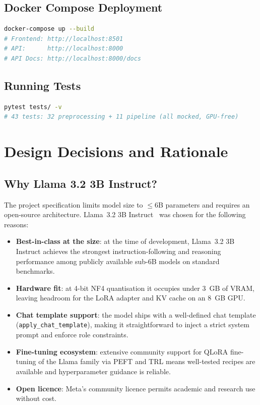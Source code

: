 \documentclass[12pt,a4paper]{article}
\begin{document}
\subsection{Docker Compose Deployment}

\begin{lstlisting}[language=bash, caption={Single-command containerised deployment}]
docker-compose up --build
# Frontend: http://localhost:8501
# API:      http://localhost:8000
# API Docs: http://localhost:8000/docs
\end{lstlisting}

\subsection{Running Tests}

\begin{lstlisting}[language=bash, caption={Unit test execution (no GPU required)}]
pytest tests/ -v
# 43 tests: 32 preprocessing + 11 pipeline (all mocked, GPU-free)
\end{lstlisting}

\section{Design Decisions and Rationale}

\subsection{Why Llama 3.2 3B Instruct?}

The project specification limits model size to $\leq$6B parameters and requires
an open-source architecture.  Llama~3.2 3B Instruct~\cite{llama32} was chosen
for the following reasons:

\begin{itemize}
  \item \textbf{Best-in-class at the size}: at the time of development, Llama~3.2
        3B Instruct achieves the strongest instruction-following and reasoning
        performance among publicly available sub-6B models on standard benchmarks.
  \item \textbf{Hardware fit}: at 4-bit NF4 quantisation it occupies under 3~GB of
        VRAM, leaving headroom for the LoRA adapter and KV cache on an 8~GB GPU.
  \item \textbf{Chat template support}: the model ships with a well-defined chat
        template (\texttt{apply\_chat\_template}), making it straightforward to
        inject a strict system prompt and enforce role constraints.
  \item \textbf{Fine-tuning ecosystem}: extensive community support for QLoRA
        fine-tuning of the Llama family via PEFT and TRL means well-tested
        recipes are available and hyperparameter guidance is reliable.
  \item \textbf{Open licence}: Meta's community licence permits academic and
        research use without cost.
\end{itemize}
\end{document}
